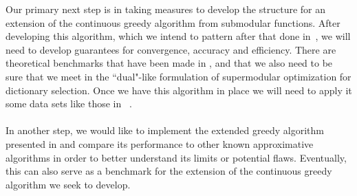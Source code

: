 \documentclass{article}
\begin{document}
Our primary next step is in taking measures to develop the structure for an extension of the continuous greedy algorithm from submodular functions. After developing this algorithm, which we intend to pattern after that done in~\cite{Singer16TwoStage}, we will need to develop guarantees for convergence, accuracy and efficiency. There are theoretical benchmarks that have been made in \cite{greedy_selection}, \cite{Krause05near-optimalnonmyopic} and \cite{nonconvexrelax} that we also need to be sure that we meet in the ``dual"-like formulation of supermodular optimization for dictionary selection. Once we have this algorithm in place we will need to apply it some data sets like those in ~\cite{Singer16TwoStage}.
\\
\\
In another step, we would like to implement the extended greedy algorithm presented in \cite{weaklyalpha} and compare its performance to other known approximative algorithms in order to better understand its limits or potential flaws. Eventually, this can also serve as a benchmark for the extension of the continuous greedy algorithm we seek to develop.




\end{document}
